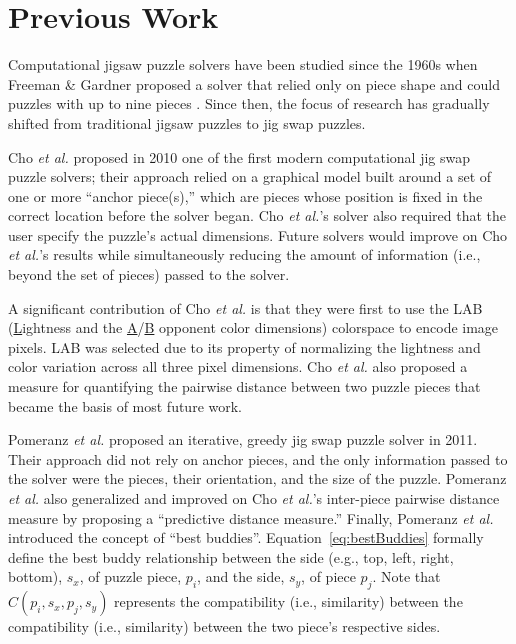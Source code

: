 \chapter{Previous Work}\label{chap:previous_work}

Computational jigsaw puzzle solvers have been studied since the 1960s when Freeman \& Gardner proposed a solver that relied only on piece shape and could puzzles with up to nine pieces \cite{freeman1964}.  Since then, the focus of research has gradually shifted from traditional jigsaw puzzles to jig swap puzzles.  

Cho \textit{et al.} \cite{cho2010} proposed in 2010 one of the first modern computational jig swap puzzle solvers; their approach relied on a graphical model built around a set of one or more ``anchor piece(s),'' which are pieces whose position is fixed in the correct location before the solver began.  Cho \textit{et al.}'s solver also required that the user specify the puzzle's actual dimensions.  Future solvers would improve on Cho \textit{et al.}'s results while simultaneously reducing the amount of information (i.e., beyond the set of pieces) passed to the solver.

A significant contribution of Cho \textit{et al.} is that they were first to use the LAB  (\underline{L}ightness and the \underline{A}/\underline{B} opponent color dimensions) colorspace to encode image pixels.  LAB was selected due to its property of normalizing the lightness and color variation across all three pixel dimensions.  Cho \textit{et al.} also proposed a measure for quantifying the pairwise distance between two puzzle pieces that became the basis of most future work.  

Pomeranz \textit{et al.} \cite{pomeranz2011} proposed an iterative, greedy jig swap puzzle solver in 2011.  Their approach did not rely on anchor pieces, and the only information passed to the solver were the pieces, their orientation, and the size of the puzzle.  Pomeranz \textit{et al.} also generalized and improved on Cho \textit{et al.}'s inter-piece pairwise distance measure by proposing a ``predictive distance measure.''  Finally, Pomeranz \textit{et al.} introduced the concept of ``best buddies''. Equation~\ref{eq:bestBuddies} formally define the best buddy relationship between the side (e.g., top, left, right, bottom), $s_x$, of puzzle piece, $p_i$, and the side, $s_y$, of piece $p_j$.  Note that $C(p_i, s_x, p_j, s_y)$ represents the compatibility (i.e., similarity) between the compatibility (i.e., similarity) between the two piece's respective sides.

